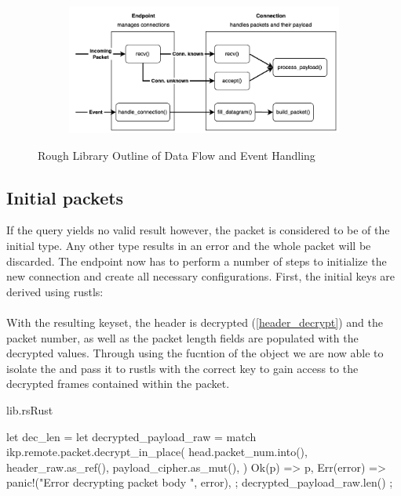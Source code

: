 \begin{figure}[h]
    \centering
    \begin{subfigure}[b]{1.0\textwidth}
      \includegraphics[width=1.0\linewidth]{img/lib_design.png}
    \end{subfigure}
    \caption{Rough Library Outline of Data Flow and Event Handling}
    \label{grafik_lib_design}
\end{figure}

\subsection{Initial packets} \label{initial_conn}

If the query yields no valid result however, the packet is considered to be of the initial type. Any other type results in an error and the
whole packet will be discarded. The endpoint now has to perform a number of steps to initialize the new connection and create all
necessary configurations. First, the initial keys are derived using rustls: \\
 \\
With the resulting keyset, the header is decrypted (\ref{header_decrypt}) and the packet number, as well as the packet length fields are
populated with the decrypted values. Through using the  fucntion of the  object we are now
able to isolate the  and pass it to rustls
with the correct key to gain access to the decrypted frames contained within the packet.

\begin{codeblock}{lib.rs}{Rust}
    \begin{rustcode}
        let dec_len = {
            let decrypted_payload_raw = match ikp.remote.packet.decrypt_in_place(
                head.packet_num.into(),
                header_raw.as_ref(),
                payload_cipher.as_mut(),
            ) {
                Ok(p) => p,
                Err(error) => panic!("Error decrypting packet body {}", error),
            };
            decrypted_payload_raw.len()
        };
    \end{rustcode}
\end{codeblock}

